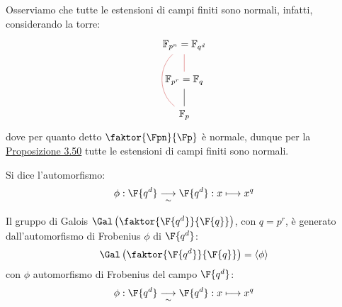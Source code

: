 \documentclass[11pt]{scrartcl}
\begin{document}
\begin{remark}
    Osserviamo che tutte le estensioni di campi finiti sono normali, infatti, considerando la torre:
    \[\begin{tikzcd}
        {\mathbb{F}_{p^n}=\mathbb{F}_{q^d} } \\
        {\mathbb{F}_{p^r}=\mathbb{F}_{q} } \\
        {\mathbb{F}_{p}}
        \arrow[no head, from=3-1, to=2-1]
        \arrow[color={rgb,255:red,214;green,92;blue,92}, no head, from=2-1, to=1-1]
        \arrow[color={rgb,255:red,214;green,92;blue,92}, bend right = 50, no head, from=1-1, to=3-1]
    \end{tikzcd}\]
    dove per quanto detto $\faktor{\Fpn}{\Fp}$ è normale, dunque per la \hyperref[3.50]{Proposizione 3.50} tutte le estensioni di campi finiti sono normali.
\end{remark}

\begin{definition}
    Si dice  l'automorfismo:
    \[ \phi : \F{q^d} \underset{\sim}{\longrightarrow} \F{q^d} : x \longmapsto x^q
        \]
\end{definition}

\begin{theorem}
    Il gruppo di Galois $\Gal\left(\faktor{\F{q^d}}{\F{q}}\right)$, con $q = p^r$, è generato dall'automorfismo di Frobenius $\phi$ di $\F{q^d}$:
    \[ \Gal\left(\faktor{\F{q^d}}{\F{q}}\right) = \left<\phi\right>
        \]
    con $\phi$ automorfismo di Frobenius del campo $\F{q^d}$:
    \[ \phi : \F{q^d} \underset{\sim}{\longrightarrow} \F{q^d} : x \longmapsto x^q
        \]
\end{theorem}
\end{document}
